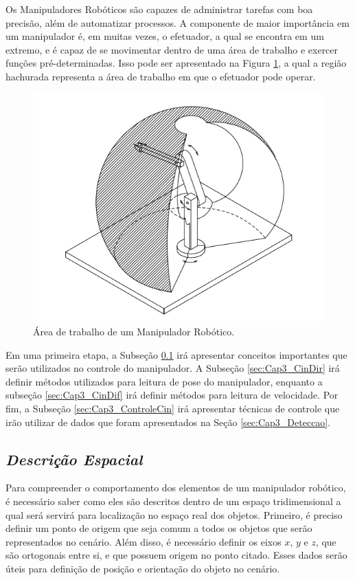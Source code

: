 Os Manipuladores Robóticos são capazes de administrar tarefas com boa precisão, além de automatizar processos. A componente de maior importância em um manipulador é, em muitas vezes, o efetuador, a qual se encontra em um extremo, e é capaz de se movimentar dentro de uma área de trabalho e exercer funções pré-determinadas. Isso pode ser apresentado na Figura \ref{fig:workspace}, a qual a região hachurada representa a área de trabalho em que o efetuador pode operar.

\begin{figure}[h!]
\centering
\includegraphics[width=0.7\columnwidth]{Imagens/workspace.PNG}
\caption{Área de trabalho de um Manipulador Robótico. \cite{siciliano2010robotics}}
\label{fig:workspace}
\end{figure}

Em uma primeira etapa, a Subseção \ref{sec:Cap3_Espacial} irá apresentar conceitos importantes que serão utilizados no controle do manipulador. A Subseção \ref{sec:Cap3_CinDir} irá definir métodos utilizados para leitura de pose do manipulador, enquanto a subseção \ref{sec:Cap3_CinDif} irá definir métodos para leitura de velocidade. Por fim, a Subseção \ref{sec:Cap3_ControleCin} irá apresentar técnicas de controle que irão utilizar de dados que foram apresentados na Seção \ref{sec:Cap3_Deteccao}.

\subsection{\textit{Descrição Espacial}}\label{sec:Cap3_Espacial}

Para compreender o comportamento dos elementos de um manipulador robótico, é necessário saber como eles são descritos dentro de um espaço tridimensional a qual será servirá para localização no espaço real dos objetos. Primeiro, é preciso definir um ponto de origem que seja comum a todos os objetos que serão representados no cenário. Além disso, é necessário definir os eixos $x$, $y$ e $z$, que são ortogonais entre si, e que possuem origem no ponto citado. Esses dados serão úteis para definição de posição e orientação do objeto no cenário.


